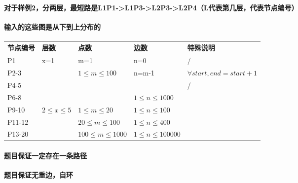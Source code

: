 \documentclass[final,11pt,oneside,UTF8]{report}
\begin{document}
\paragraph{对于样例2，分两层，最短路是L1P1->L1P3->L2P3->L2P4（L代表第几层，代表节点编号）}
\paragraph{输入的这些图是从下到上分布的}
\begin{table}[H]
    \begin{tabular}{|l|l|l|l|l|}
        \hline
        节点编号   & 层数                               & 点数                                & 边数                     & 特殊说明                        \\ \hline
        P1     & \multirow{4}{*}{x=1}             & m=1                               & n=0                    & /                           \\ \cline{1-1} \cline{3-5}
        P2-3   &                                  & \multirow{3}{*}{$1 \le m\le 100$} & \multirow{2}{*}{n=m-1} & $\forall start,end=start+1$ \\ \cline{1-1} \cline{5-5}
        P4-5   &                                  &                                   &                        & \multirow{5}{*}{/}          \\ \cline{1-1} \cline{4-4}
        P6-8   &                                  &                                   & $1 \le n \le 1000$     &                             \\ \cline{1-4}
        P9-10  & \multirow{3}{*}{$2 \le x \le 5$} & $1 \le m \le 20$                  & $1 \le n \le 100$      &                             \\ \cline{1-1} \cline{3-4}
        P11-12 &                                  & $20 \le m \le 100$                & $1 \le n \le 400$      &                             \\ \cline{1-1} \cline{3-4}
        P13-20 &                                  & $100 \le m \le 1000$              & $1 \le n \le 100000$   &                             \\ \hline
    \end{tabular}
\end{table}
\paragraph{题目保证一定存在一条路径}
\paragraph{题目保证无重边，自环}
\newpage
\end{document}
